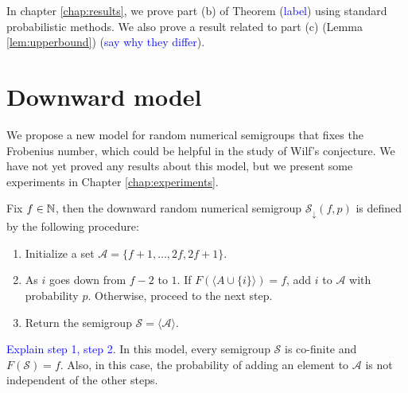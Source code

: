 In chapter \ref{chap:results}, we prove part (b) of Theorem (\textcolor{blue}{label}) using standard probabilistic methods. We also prove a result related to part (c) (Lemma \ref{lem:upperbound}) (\textcolor{blue}{say why they differ}).

\section{Downward model}\label{sec:contrib1:theme2}

We propose a new model for random numerical semigroups that fixes the Frobenius number, which could be helpful in the study of Wilf's conjecture. We have not yet proved any results about this model, but we present some experiments in Chapter \ref{chap:experiments}.

\begin{definition} Fix $f \in \mathbb{N}$, then the downward random numerical semigroup $\mathcal{S}_\downarrow(f, p)$ is defined by the following procedure: 
\begin{enumerate}
    \item Initialize a set $\mathcal{A} = \{f + 1, \ldots, 2f, 2f + 1\}$.
    \item As $i$ goes down from $f - 2$ to $1$. If $F(\langle A \cup \{i\} \rangle) = f$, add $i$ to $\mathcal{A}$ with probability $p$. Otherwise, proceed to the next step.
    \item Return the semigroup $\mathcal{S} = \langle\mathcal{A}\rangle$.
\end{enumerate}
\textcolor{blue}{Explain step 1, step 2}.
In this model, every semigroup $\mathcal{S}$ is co-finite and $F(\mathcal{S}) = f$. Also, in this case, the probability of adding an element to $\mathcal{A}$ is not independent of the other steps. 
    
\end{definition}


